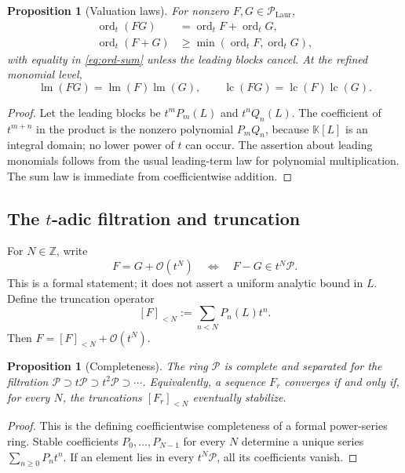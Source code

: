 \documentclass[11pt]{article}
\theoremstyle{pltheorem}
\newtheorem{proposition}[theorem]{Proposition}
\newcommand{\K}{\mathbb K}
\newcommand{\Z}{\mathbb Z}
\newcommand{\PL}{\mathscr P}
\newcommand{\PLL}{\mathscr P_{\mathrm{Laur}}}
\newcommand{\bigO}{\mathcal O}
\newcommand{\ordt}{\operatorname{ord}_t}
\newcommand{\lm}{\operatorname{lm}}
\newcommand{\lc}{\operatorname{lc}}
\begin{document}
\begin{proposition}[Valuation laws]\label{prop:valuation-laws}
For nonzero \(F,G\in\PLL\),
\begin{align}
 \ordt(FG)&=\ordt F+\ordt G,\label{eq:ord-product}\\
 \ordt(F+G)&\ge\min(\ordt F,\ordt G),\label{eq:ord-sum}
\end{align}
with equality in \cref{eq:ord-sum} unless the leading blocks cancel.  At the refined monomial level,
\[
 \lm(FG)=\lm(F)\lm(G),\qquad \lc(FG)=\lc(F)\lc(G).
\]
\end{proposition}

\begin{proof}
Let the leading blocks be \(t^mP_m(L)\) and \(t^nQ_n(L)\).  The coefficient of \(t^{m+n}\) in the product is the nonzero polynomial \(P_mQ_n\), because \(\K[L]\) is an integral domain; no lower power of \(t\) can occur.  The assertion about leading monomials follows from the usual leading-term law for polynomial multiplication.  The sum law is immediate from coefficientwise addition.
\end{proof}

\subsection{\texorpdfstring{The \(t\)-adic filtration and truncation}{The t-adic filtration and truncation}}

For \(N\in\Z\), write
\begin{equation}\label{eq:formal-big-O}
 F=G+\bigO(t^N)
 \quad\Longleftrightarrow\quad
 F-G\in t^N\PL.
\end{equation}
This is a formal statement; it does not assert a uniform analytic bound in \(L\).  Define the truncation operator
\begin{equation}\label{eq:truncation}
 [F]_{<N}:=\sum_{n<N}P_n(L)t^n.
\end{equation}
Then \(F=[F]_{<N}+\bigO(t^N)\).

\begin{proposition}[Completeness]\label{prop:complete}
The ring \(\PL\) is complete and separated for the filtration
\(\PL\supset t\PL\supset t^2\PL\supset\cdots\).  Equivalently, a sequence \(F_r\) converges if and only if, for every \(N\), the truncations \([F_r]_{<N}\) eventually stabilize.
\end{proposition}

\begin{proof}
This is the defining coefficientwise completeness of a formal power-series ring.  Stable coefficients \(P_0,\ldots,P_{N-1}\) for every \(N\) determine a unique series \(\sum_{n\ge0}P_nt^n\).  If an element lies in every \(t^N\PL\), all its coefficients vanish.
\end{proof}
\end{document}
